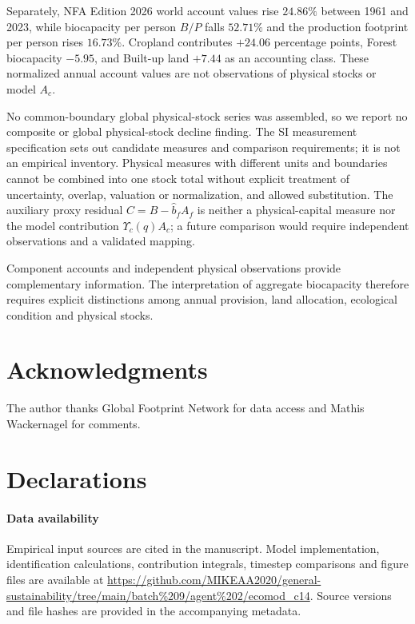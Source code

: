 \documentclass[preprint,12pt,authoryear]{elsarticle}
\newcommand{\Ups}{\Upsilon_c}
\begin{document}
Separately, NFA Edition 2026 world account values rise $24.86\%$ between 1961 and 2023, while biocapacity per person $B/P$ falls $52.71\%$ and the production footprint per person rises $16.73\%$. Cropland contributes $+24.06$ percentage points, Forest biocapacity $-5.95$, and Built-up land $+7.44$ as an accounting class. These normalized annual account values are not observations of physical stocks or model $A_c$.

\begin{samepage}
No common-boundary global physical-stock series was assembled, so we report no composite or global physical-stock decline finding. The SI measurement specification sets out candidate measures and comparison requirements; it is not an empirical inventory. Physical measures with different units and boundaries cannot be combined into one stock total without explicit treatment of uncertainty, overlap, valuation or normalization, and allowed substitution. The auxiliary proxy residual $C=B-\hat b_fA_f$ is neither a physical-capital measure nor the model contribution $\Ups(q)A_c$; a future comparison would require independent observations and a validated mapping.\par
\end{samepage}

Component accounts and independent physical observations provide complementary information. The interpretation of aggregate biocapacity therefore requires explicit distinctions among annual provision, land allocation, ecological condition and physical stocks.

\section*{Acknowledgments}

The author thanks Global Footprint Network for data access and Mathis Wackernagel for comments.

\section*{Declarations}

\paragraph{Data availability} Empirical input sources are cited in the manuscript. Model implementation, identification calculations, contribution integrals, timestep comparisons and figure files are available at \url{https://github.com/MIKEAA2020/general-sustainability/tree/main/batch%209/agent%202/ecomod_c14}. Source versions and file hashes are provided in the accompanying metadata.
\end{document}
